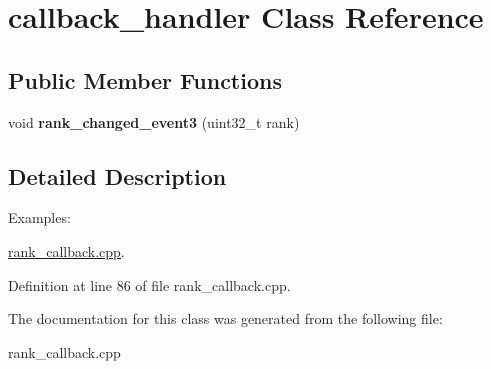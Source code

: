 \hypertarget{classcallback__handler}{\section{callback\-\_\-handler Class Reference}
\label{classcallback__handler}
}
\subsection*{Public Member Functions}
\begin{DoxyCompactItemize}
\item 
\hypertarget{classcallback__handler_add4b6645e0c9b717c5816c0dcb8ca0cf}{void {\bfseries rank\-\_\-changed\-\_\-event3} (uint32\-\_\-t rank)}\label{classcallback__handler_add4b6645e0c9b717c5816c0dcb8ca0cf}

\end{DoxyCompactItemize}


\subsection{Detailed Description}
\begin{Desc}
\item[Examples\-: ]\par
\hyperlink{rank_callback_8cpp-example}{rank\-\_\-callback.\-cpp}.\end{Desc}


Definition at line 86 of file rank\-\_\-callback.\-cpp.



The documentation for this class was generated from the following file\-:\begin{DoxyCompactItemize}
\item 
rank\-\_\-callback.\-cpp\end{DoxyCompactItemize}
